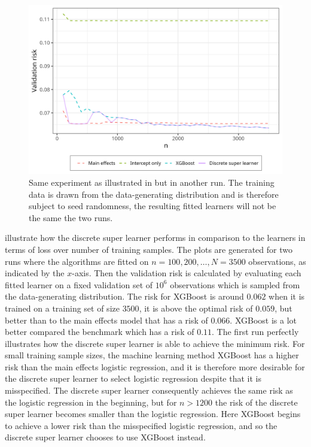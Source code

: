 \documentclass[./main.tex]{subfiles}
\begin{document}
\begin{figure}[H]
    \centering
    \includegraphics[width=\textwidth]{figures/dsl_loss_jumps.png}
    \caption{Same experiment as illustrated in  but in another run. The training data is drawn from the data-generating distribution and is therefore subject to seed randomness, the resulting fitted learners will not be the same the two runs.}
    \label{fig:loss_jumps}
\end{figure}
 illustrate how the discrete super learner performs in comparison to the learners in terms of loss over number of training samples. The plots are generated for two runs where the algorithms are fitted on $ n = 100, 200, \dots , N = 3500 $ observations, as indicated by the $ x $-axis. Then the validation risk is calculated by evaluating each fitted learner on a fixed validation set of $ 10^{6} $ observations which is sampled from the data-generating distribution.  
The risk for XGBoost is around $ 0.062 $ when it is trained on a training set of size $ 3500 $, it is above the optimal risk of $ 0.059 $, but better than to the main effects model that has a risk of $ 0.066 $. XGBoost is a lot better compared the benchmark which has a risk of $ 0.11 $. 
The first run perfectly illustrates how the discrete super learner is able to achieve the minimum risk. For small training sample sizes, the machine learning method XGBoost has a higher risk than the main effects logistic regression, and it is therefore more desirable for the discrete super learner to select logistic regression despite that it is misspecified. The discrete super learner consequently achieves the same risk as the logistic regression in the beginning, but for $ n > 1200 $ the risk of the discrete super learner becomes smaller than the logistic regression. Here XGBoost begins to achieve a lower risk than the misspecified logistic regression, and so the discrete super learner chooses to use XGBoost instead. 
\end{document}
